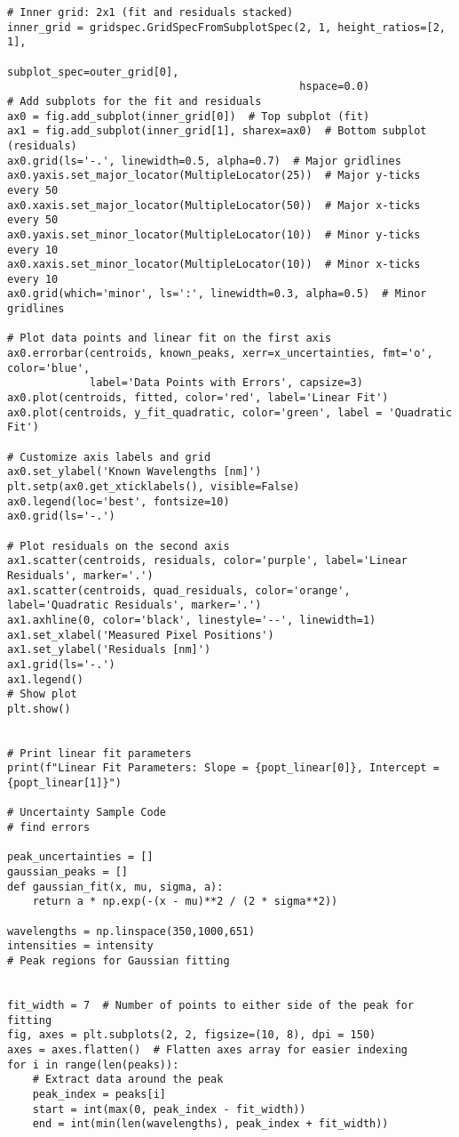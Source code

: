 \documentclass[10pt, preprint]{aastex}
\begin{document}
\begin{verbatim}
# Inner grid: 2x1 (fit and residuals stacked)
inner_grid = gridspec.GridSpecFromSubplotSpec(2, 1, height_ratios=[2, 1],
                                              subplot_spec=outer_grid[0],
                                              hspace=0.0)
# Add subplots for the fit and residuals
ax0 = fig.add_subplot(inner_grid[0])  # Top subplot (fit)
ax1 = fig.add_subplot(inner_grid[1], sharex=ax0)  # Bottom subplot (residuals)
ax0.grid(ls='-.', linewidth=0.5, alpha=0.7)  # Major gridlines
ax0.yaxis.set_major_locator(MultipleLocator(25))  # Major y-ticks every 50
ax0.xaxis.set_major_locator(MultipleLocator(50))  # Major x-ticks every 50
ax0.yaxis.set_minor_locator(MultipleLocator(10))  # Minor y-ticks every 10
ax0.xaxis.set_minor_locator(MultipleLocator(10))  # Minor x-ticks every 10
ax0.grid(which='minor', ls=':', linewidth=0.3, alpha=0.5)  # Minor gridlines

# Plot data points and linear fit on the first axis
ax0.errorbar(centroids, known_peaks, xerr=x_uncertainties, fmt='o', color='blue', 
             label='Data Points with Errors', capsize=3)
ax0.plot(centroids, fitted, color='red', label='Linear Fit')
ax0.plot(centroids, y_fit_quadratic, color='green', label = 'Quadratic Fit')

# Customize axis labels and grid
ax0.set_ylabel('Known Wavelengths [nm]')
plt.setp(ax0.get_xticklabels(), visible=False)
ax0.legend(loc='best', fontsize=10)
ax0.grid(ls='-.')

# Plot residuals on the second axis
ax1.scatter(centroids, residuals, color='purple', label='Linear Residuals', marker='.')
ax1.scatter(centroids, quad_residuals, color='orange', label='Quadratic Residuals', marker='.')
ax1.axhline(0, color='black', linestyle='--', linewidth=1)
ax1.set_xlabel('Measured Pixel Positions')
ax1.set_ylabel('Residuals [nm]')
ax1.grid(ls='-.')
ax1.legend()
# Show plot
plt.show()


# Print linear fit parameters
print(f"Linear Fit Parameters: Slope = {popt_linear[0]}, Intercept = {popt_linear[1]}")

# Uncertainty Sample Code
# find errors

peak_uncertainties = []
gaussian_peaks = []
def gaussian_fit(x, mu, sigma, a):
    return a * np.exp(-(x - mu)**2 / (2 * sigma**2))

wavelengths = np.linspace(350,1000,651)
intensities = intensity
# Peak regions for Gaussian fitting


fit_width = 7  # Number of points to either side of the peak for fitting
fig, axes = plt.subplots(2, 2, figsize=(10, 8), dpi = 150)
axes = axes.flatten()  # Flatten axes array for easier indexing
for i in range(len(peaks)):
    # Extract data around the peak
    peak_index = peaks[i]
    start = int(max(0, peak_index - fit_width))
    end = int(min(len(wavelengths), peak_index + fit_width))
    

\end{verbatim}
\end{document}
